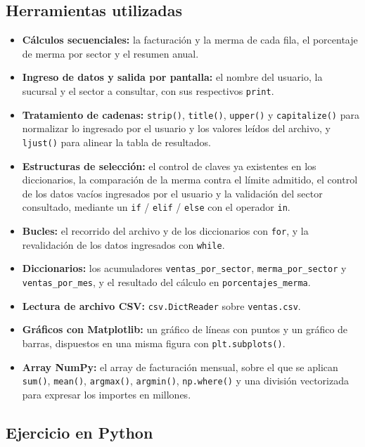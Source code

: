 \documentclass[12pt]{article}
\begin{document}
\subsection*{Herramientas utilizadas}

\begin{itemize}[noitemsep]
    \item \textbf{Cálculos secuenciales:} la facturación y la merma de cada fila, el porcentaje de merma por sector y el resumen anual.
    \item \textbf{Ingreso de datos y salida por pantalla:} el nombre del usuario, la sucursal y el sector a consultar, con sus respectivos \texttt{print}.
    \item \textbf{Tratamiento de cadenas:} \texttt{strip()}, \texttt{title()}, \texttt{upper()} y \texttt{capitalize()} para normalizar lo ingresado por el usuario y los valores leídos del archivo, y \texttt{ljust()} para alinear la tabla de resultados.
    \item \textbf{Estructuras de selección:} el control de claves ya existentes en los diccionarios, la comparación de la merma contra el límite admitido, el control de los datos vacíos ingresados por el usuario y la validación del sector consultado, mediante un \texttt{if} / \texttt{elif} / \texttt{else} con el operador \texttt{in}.
    \item \textbf{Bucles:} el recorrido del archivo y de los diccionarios con \texttt{for}, y la revalidación de los datos ingresados con \texttt{while}.
    \item \textbf{Diccionarios:} los acumuladores \texttt{ventas\_por\_sector}, \texttt{merma\_por\_sector} y \texttt{ventas\_por\_mes}, y el resultado del cálculo en \texttt{porcentajes\_merma}.
    \item \textbf{Lectura de archivo CSV:} \texttt{csv.DictReader} sobre \texttt{ventas.csv}.
    \item \textbf{Gráficos con Matplotlib:} un gráfico de líneas con puntos y un gráfico de barras, dispuestos en una misma figura con \texttt{plt.subplots()}.
    \item \textbf{Array NumPy:} el array de facturación mensual, sobre el que se aplican \texttt{sum()}, \texttt{mean()}, \texttt{argmax()}, \texttt{argmin()}, \texttt{np.where()} y una división vectorizada para expresar los importes en millones.
\end{itemize}

\newpage
\subsection*{Ejercicio en Python}
\end{document}
